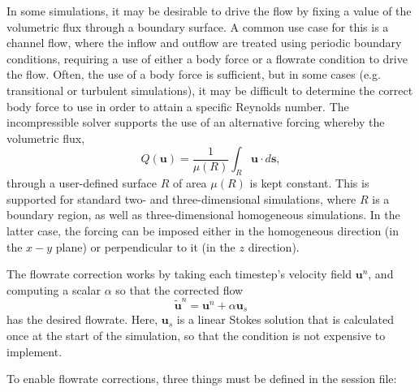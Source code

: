 In some simulations, it may be desirable to drive the flow by fixing a value of
the volumetric flux through a boundary surface. A common use case for this is a
channel flow, where the inflow and outflow are treated using periodic boundary
conditions, requiring a use of either a body force or a flowrate condition to
drive the flow. Often, the use of a body force is sufficient, but in some cases
(e.g. transitional or turbulent simulations), it may be difficult to determine
the correct body force to use in order to attain a specific Reynolds number. The
incompressible solver supports the use of an alternative forcing whereby the
volumetric flux,
%
\[
  Q(\mathbf{u}) = \frac{1}{\mu(R)} \int_R \mathbf{u}\cdot d\mathbf{s},
\]
%
through a user-defined surface $R$ of area $\mu(R)$ is kept constant. This is
supported for standard two- and three-dimensional simulations, where $R$ is a
boundary region, as well as three-dimensional homogeneous simulations. In the
latter case, the forcing can be imposed either in the homogeneous direction (in
the $x-y$ plane) or perpendicular to it (in the $z$ direction).

The flowrate correction works by taking each timestep's velocity field
$\mathbf{u}^{n}$, and computing a scalar $\alpha$ so that the corrected flow
%
\[
  \tilde{\mathbf{u}}^n = \mathbf{u}^n + \alpha\mathbf{u}_s
\]
has the desired flowrate. Here, $\mathbf{u}_s$ is a linear Stokes solution that
is calculated once at the start of the simulation, so that the condition is not
expensive to implement.

To enable flowrate corrections, three things must be defined in the session
file:

